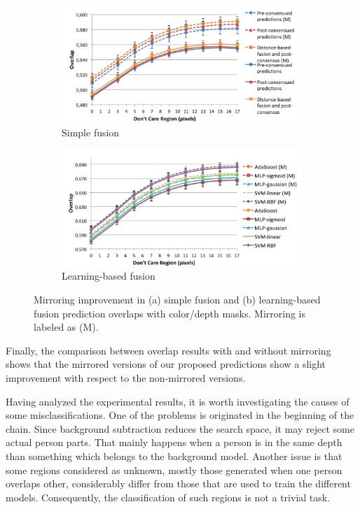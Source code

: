\documentclass[10pt,twocolumn,letterpaper]{article}
\begin{document}
\begin{figure}[htpb]
\centering
\begin{subfigure}[b]{1\columnwidth}
	\includegraphics[width=\columnwidth]{simple_fusion_comparison.png}%
	\caption{Simple fusion}%
	\label{}%
\end{subfigure}
\begin{subfigure}[b]{1\columnwidth}
	\includegraphics[width=\columnwidth]{learning_fusion_comparison.png}%
	\caption{Learning-based fusion}%
	\label{}%
\end{subfigure}
\caption{Mirroring improvement in (a) simple fusion and (b) learning-based fusion prediction overlaps with color/depth masks. Mirroring is labeled as (M).}
\label{fig:mirroring_comparison}
\end{figure}

Finally, the comparison between overlap results with and without mirroring shows that the mirrored versions of our proposed predictions show a slight improvement with respect to the non-mirrored versions.

Having analyzed the experimental results, it is worth investigating the causes of some
misclassifications. One of the problems is originated in the beginning of the chain. Since
background subtraction reduces the search space, it may reject some actual person parts.
That mainly happens when a person is in the same depth than something which belongs
to the background model. Another issue is that some regions considered as unknown,
mostly those generated when one person overlaps other, considerably differ from those
that are used to train the different models. Consequently, the classification of such regions
is not a trivial task.
\end{document}
